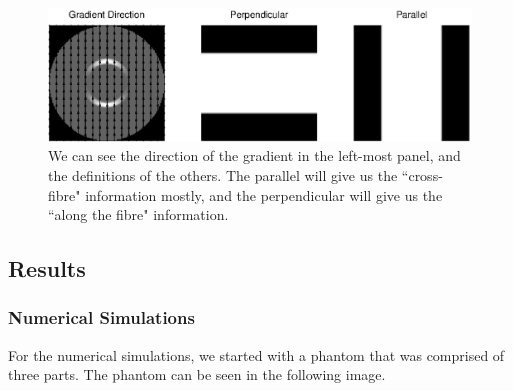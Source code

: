 \documentclass[11 pt]{article}
\begin{document}
    \begin{figure}[h] 

    \centering
    \vspace{0pt}
    \setlength\fboxsep{0pt}
    \setlength\fboxrule{0.5pt}
    \includegraphics[trim = {0mm 0mm 0mm 0mm},clip,scale = 0.8] {Figs/numericalSims/GradDir01.eps}
    \caption{We can see the direction of the gradient in the left-most panel, and the definitions of the others. The parallel will give us the ``cross-fibre" information mostly, and the perpendicular will give us the ``along the fibre" information.}
    \label{fig:GradDir}

  \end{figure}

  \subsection{Results}
  
    \subsubsection{Numerical Simulations}
    
    For the numerical simulations, we started with a phantom that was comprised of three parts. The phantom can be seen in the following image.
    
\end{document}

